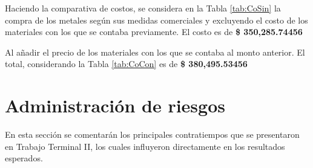 Haciendo la comparativa de costos, se considera en la Tabla \ref{tab:CoSin} la compra de los metales según sus medidas comerciales y excluyendo el costo de los materiales con los que se contaba previamente. El costo es de
\textcolor[rgb]{ 1,  0,  0}{\textbf{ \$  350,285.74456 }}
\newline

Al añadir el precio de los materiales con los que se contaba al monto anterior. El total, considerando la Tabla \ref{tab:CoCon} es de
\textcolor[rgb]{ 1,  0,  0}{\textbf{ \$  380,495.53456 }}
\newpage




\newpage
\section{Administración de riesgos}
En esta sección se comentarán los principales contratiempos que se presentaron en Trabajo Terminal II, los cuales influyeron directamente en los resultados esperados.

